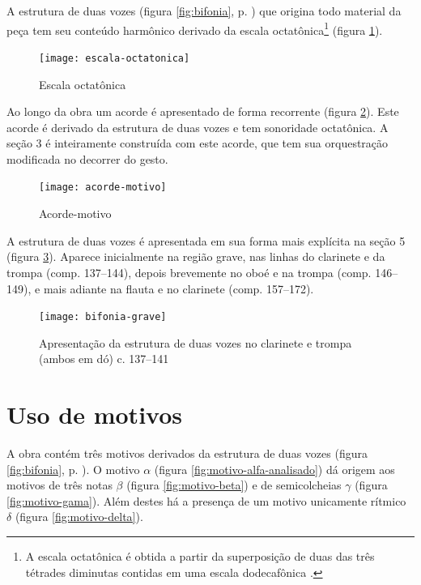 A estrutura de duas vozes (figura \ref{fig:bifonia},
p. \pageref{fig:bifonia}) que origina todo material da peça tem seu
conteúdo harmônico derivado da escala octatônica\footnote{A escala
  octatônica é obtida a partir da superposição de duas das três
  tétrades diminutas contidas em uma escala dodecafônica
  \cite[p. 76]{antokoletz90:music}.} (figura
\ref{fig:escala-octatonica}).

\begin{figure}
  \centering
  \texttt{[image: escala-octatonica]}
  \caption{Escala octatônica}
  \label{fig:escala-octatonica}
\end{figure}

Ao longo da obra um acorde é apresentado de forma recorrente (figura
\ref{fig:acorde-motivo}). Este acorde é derivado da estrutura de duas
vozes e tem sonoridade octatônica. A seção 3 é inteiramente construída
com este acorde, que tem sua orquestração modificada no decorrer do
gesto.

\begin{figure}
  \centering
  \texttt{[image: acorde-motivo]}
  \caption{Acorde-motivo}
  \label{fig:acorde-motivo}
\end{figure}

A estrutura de duas vozes é apresentada em sua forma mais explícita na
seção 5 (figura \ref{fig:bifonia-grave}). Aparece inicialmente na
região grave, nas linhas do clarinete e da trompa (comp. 137--144),
depois brevemente no oboé e na trompa (comp. 146--149), e mais adiante
na flauta e no clarinete (comp. 157--172).

\begin{figure}
  \centering
  \texttt{[image: bifonia-grave]}
  \caption{Apresentação da estrutura de duas vozes no clarinete e
    trompa (ambos em dó) c. 137--141}
  \label{fig:bifonia-grave}
\end{figure}
\section{Uso de motivos}
\label{sec:uso-de-motivos}

A obra contém três motivos derivados da estrutura de duas vozes
(figura \ref{fig:bifonia}, p. \pageref{fig:bifonia}). O motivo
$\alpha$ (figura \ref{fig:motivo-alfa-analisado}) dá origem aos
motivos de três notas $\beta$ (figura \ref{fig:motivo-beta}) e de
semicolcheias $\gamma$ (figura \ref{fig:motivo-gama}). Além destes há
a presença de um motivo unicamente rítmico $\delta$ (figura
\ref{fig:motivo-delta}).

